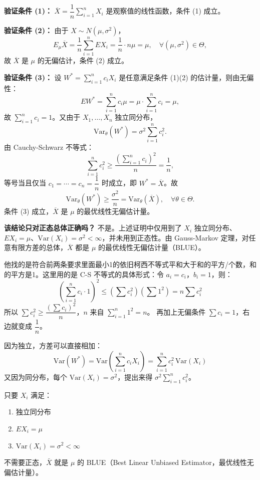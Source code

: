 \begin{solution}
\textbf{验证条件 (1)：} $\overline{X} = \dfrac{1}{n}\sum_{i=1}^n X_i$ 是观察值的线性函数，条件 (1) 成立。

\textbf{验证条件 (2)：} 由于 $X \sim N(\mu, \sigma^2)$，
$$
E_\mu \overline{X} = \frac{1}{n}\sum_{i=1}^n EX_i = \frac{1}{n} \cdot n\mu = \mu, \quad \forall (\mu,\sigma^2) \in \Theta,
$$
故 $\overline{X}$ 是 $\mu$ 的无偏估计，条件 (2) 成立。

\textbf{验证条件 (3)：} 设 $W^* = \sum_{i=1}^n c_i X_i$ 是任意满足条件 (1)(2) 的估计量，则由无偏性：
$$
E W^* = \sum_{i=1}^n c_i \mu = \mu \cdot \sum_{i=1}^n c_i = \mu,
$$
故 $\sum_{i=1}^n c_i = 1$。又由于 $X_1,\ldots,X_n$ 独立同分布，
$$
\mathrm{Var}_\theta(W^*) = \sigma^2 \sum_{i=1}^n c_i^2.
$$
由 Cauchy-Schwarz 不等式：
$$
\sum_{i=1}^n c_i^2 \geq \frac{\left(\sum_{i=1}^n c_i\right)^2}{n} = \frac{1}{n},
$$
等号当且仅当 $c_1 = \cdots = c_n = \dfrac{1}{n}$ 时成立，即 $W^* = \overline{X}$。故
$$
\mathrm{Var}_\theta(W^*) \geq \frac{\sigma^2}{n} = \mathrm{Var}_\theta(\overline{X}), \quad \forall \theta \in \Theta.
$$
条件 (3) 成立，$\overline{X}$ 是 $\mu$ 的最优线性无偏估计量。

\textbf{该结论只对正态总体正确吗？} 不是。上述证明中仅用到了 $X_i$ 独立同分布、$EX_i = \mu$、$\mathrm{Var}(X_i) = \sigma^2 < \infty$，并未用到正态性。由 Gauss-Markov 定理，对任意有限方差的总体，$\overline{X}$ 都是 $\mu$ 的最优线性无偏估计量（BLUE）。
\end{solution}
\begin{dxtips}
    他找的是符合前两条要求里面最小1的依旧柯西不等式平和大于和的平方/个数，和的平方是1。这里用的是 C-S 不等式的具体形式：令 $a_i = c_i$，$b_i = 1$，则：
$$\left(\sum_{i=1}^n c_i \cdot 1\right)^2 \leq \left(\sum c_i^2\right)\left(\sum 1^2\right) = n\sum c_i^2$$
所以 $\sum c_i^2 \geq \dfrac{(\sum c_i)^2}{n}$，$n$ 来自 $\sum_{i=1}^n 1^2 = n$。
再加上无偏条件 $\sum c_i = 1$，右边就变成 $\dfrac{1}{n}$。
\end{dxtips}
\begin{dxtips}
因为独立，方差可以直接相加：
$$\mathrm{Var}(W^*) = \mathrm{Var}\!\left(\sum_{i=1}^n c_i X_i\right) = \sum_{i=1}^n c_i^2\,\mathrm{Var}(X_i)$$
又因为同分布，每个 $\mathrm{Var}(X_i)=\sigma^2$，提出来得 $\sigma^2\sum_{i=1}^n c_i^2$。
\end{dxtips}
\begin{note}
只要 $X_i$ 满足：
\begin{enumerate}
    \item 独立同分布
    \item $EX_i = \mu$
    \item $\mathrm{Var}(X_i) = \sigma^2 < \infty$
\end{enumerate}
不需要正态，$\bar{X}$ 就是 $\mu$ 的 BLUE（Best Linear Unbiased Estimator，最优线性无偏估计量）。
\end{note}
